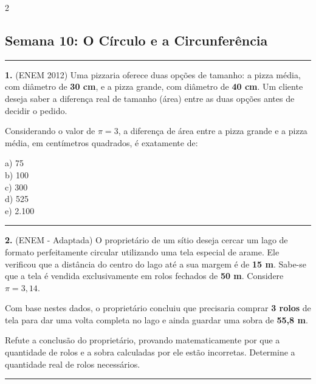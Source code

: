 \documentclass[11pt, a4paper]{article}
\begin{document}
\raggedcolumns
\begin{multicols*}{2}

\vspace{0.5cm}
\subsection*{Semana 10: O Círculo e a Circunferência}
\vspace{-0.2cm}\noindent\rule{\linewidth}{1.2pt} 
\vspace{0.2cm}

\textbf{1.} (ENEM 2012) Uma pizzaria oferece duas opções de tamanho: a pizza média, com diâmetro de \textbf{30 cm}, e a pizza grande, com diâmetro de \textbf{40 cm}. Um cliente deseja saber a diferença real de tamanho (área) entre as duas opções antes de decidir o pedido. 

Considerando o valor de $\pi = 3$, a diferença de área entre a pizza grande e a pizza média, em centímetros quadrados, é exatamente de:

a) 75\\[0.3cm]
b) 100\\[0.3cm]
c) 300\\[0.3cm]
d) 525\\[0.3cm]
e) 2.100\\[0.3cm]

\vspace{0.4cm}
\noindent\textcolor{CorLinha}{\rule{\linewidth}{0.5pt}} 
\vspace{0.2cm}

\textbf{2.} (ENEM - Adaptada) O proprietário de um sítio deseja cercar um lago de formato perfeitamente circular utilizando uma tela especial de arame. Ele verificou que a distância do centro do lago até a sua margem é de \textbf{15 m}. Sabe-se que a tela é vendida exclusivamente em rolos fechados de \textbf{50 m}. Considere $\pi = 3,14$.

Com base nestes dados, o proprietário concluiu que precisaria comprar \textbf{3 rolos} de tela para dar uma volta completa no lago e ainda guardar uma sobra de \textbf{55,8 m}. 

Refute a conclusão do proprietário, provando matematicamente por que a quantidade de rolos e a sobra calculadas por ele estão incorretas. Determine a quantidade real de rolos necessários.

\vspace{2.5cm}

\vspace{0.4cm}
\noindent\textcolor{CorLinha}{\rule{\linewidth}{0.5pt}} 
\vspace{0.2cm}


\end{multicols*}
\end{document}
